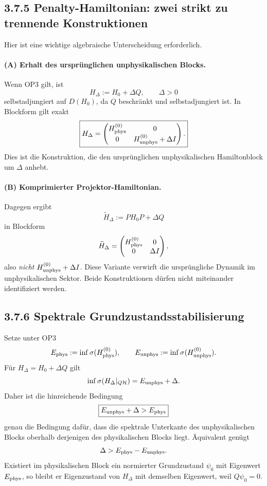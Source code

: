 \documentclass[11pt,a4paper]{article}
\begin{document}
\subsection*{3.7.5 Penalty-Hamiltonian: zwei strikt zu trennende Konstruktionen}
Hier ist eine wichtige algebraische Unterscheidung erforderlich.

\paragraph{(A) Erhalt des ursprünglichen unphysikalischen Blocks.}
Wenn OP3 gilt, ist
\[
\boxed{H_\Delta:=H_0+\Delta Q,\qquad\Delta>0}
\]
selbstadjungiert auf $D(H_0)$, da $Q$ beschränkt und selbstadjungiert ist. In Blockform gilt exakt
\[
\boxed{
H_\Delta=
\begin{pmatrix}
H_{\rm phys}^{(0)}&0\\
0&H_{\rm unphys}^{(0)}+\Delta I
\end{pmatrix}.}
\]
Dies ist die Konstruktion, die den ursprünglichen unphysikalischen Hamiltonblock um $\Delta$ anhebt.

\paragraph{(B) Komprimierter Projektor-Hamiltonian.}
Dagegen ergibt
\[
\widetilde H_\Delta:=PH_0P+\Delta Q
\]
in Blockform
\[
\widetilde H_\Delta=
\begin{pmatrix}
H_{\rm phys}^{(0)}&0\\
0&\Delta I
\end{pmatrix},
\]
also \emph{nicht} $H_{\rm unphys}^{(0)}+\Delta I$. Diese Variante verwirft die ursprüngliche Dynamik im unphysikalischen Sektor. Beide Konstruktionen dürfen nicht miteinander identifiziert werden.

\subsection*{3.7.6 Spektrale Grundzustandsstabilisierung}
Setze unter OP3
\[
E_{\rm phys}:=\inf\sigma(H_{\rm phys}^{(0)}),
\qquad
E_{\rm unphys}:=\inf\sigma(H_{\rm unphys}^{(0)}).
\]
Für $H_\Delta=H_0+\Delta Q$ gilt
\[
\inf\sigma(H_\Delta|_{Q\mathcal H})=E_{\rm unphys}+\Delta.
\]
Daher ist die hinreichende Bedingung
\[
\boxed{E_{\rm unphys}+\Delta>E_{\rm phys}}
\]
genau die Bedingung dafür, dass die spektrale Unterkante des unphysikalischen Blocks oberhalb derjenigen des physikalischen Blocks liegt. Äquivalent genügt
\[
\Delta>E_{\rm phys}-E_{\rm unphys}.
\]
Existiert im physikalischen Block ein normierter Grundzustand $\psi_0$ mit Eigenwert $E_{\rm phys}$, so bleibt er Eigenzustand von $H_\Delta$ mit demselben Eigenwert, weil $Q\psi_0=0$.
\end{document}
